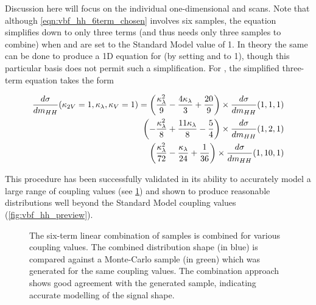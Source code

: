     Discussion here will focus on the individual one-dimensional \kvv and \kl scans.
    Note that although \ref{eqn:vbf_hh_6term_chosen} involves six samples, the equation simplifies down to only three terms (and thus needs only three samples to combine) when \kvv and \kv are set to the Standard Model value of 1.
    In theory the same can be done to produce a 1D equation for \kvv (by setting \kl and \kv to 1), though this particular basis does not permit such a simplification.
    For \kl, the simplified three-term equation takes the form

    \begin{equation}
    \label{eqn:vbf_hh_3term_kl}
    \begin{split}
        \frac{d\sigma}{dm_{HH}}(\kappa_{2V}=1, \kappa_{\lambda}, \kappa_{V}=1) =
        \left(\frac{\kappa_{\lambda}^{2}}{9} - \frac{4 \kappa_{\lambda}}{3} + \frac{20}{9}\right) \times
            \frac{d\sigma}{dm_{HH}}{\left(1,1,1 \right)} \\
        \left(- \frac{\kappa_{\lambda}^{2}}{8} + \frac{11 \kappa_{\lambda}}{8} - \frac{5}{4}\right) \times
            \frac{d\sigma}{dm_{HH}}{\left(1,2,1 \right)} \\
        \left(\frac{\kappa_{\lambda}^{2}}{72} - \frac{\kappa_{\lambda}}{24} + \frac{1}{36}\right) \times
            \frac{d\sigma}{dm_{HH}}{\left(1,10,1 \right)}
    \end{split}
    \end{equation}



    This procedure has been successfully validated in its ability to accurately model a large range of coupling values (see \ref{fig:vbf_hh_validation}) and shown to produce reasonable distributions well beyond the Standard Model coupling values (\ref{fig:vbf_hh_preview}).

    \begin{figure}
    	\centering
        \caption{
            The six-term linear combination of samples is combined for various coupling values.
            The combined distribution shape (in blue) is compared against a Monte-Carlo sample (in green) which was generated for the same coupling values.
            The combination approach shows good agreement with the generated sample, indicating accurate modelling of the signal shape.
        }
        \label{fig:vbf_hh_validation}
    \end{figure}



